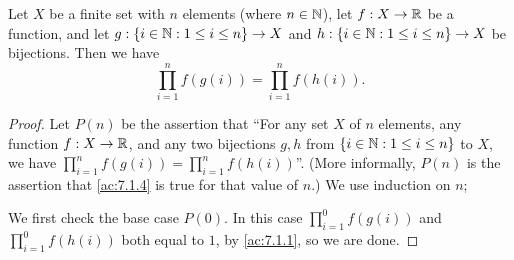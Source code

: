 \begin{ac}\label{ac:7.1.4}
  Let \(X\) be a finite set with \(n\) elements (where \(n \in \mathbb{N}\)), let \(f : X \to \mathbb{R}\) be a function, and let \(g : \{i \in \mathbb{N} : 1 \leq i \leq n\} \to X\) and \(h : \{i \in \mathbb{N} : 1 \leq i \leq n\} \to X\) be bijections.
  Then we have
  \[
    \prod_{i = 1}^n f(g(i)) = \prod_{i = 1}^n f(h(i)).
  \]
\end{ac}

\begin{proof}
  Let \(P(n)\) be the assertion that ``For any set \(X\) of \(n\) elements, any function \(f : X \to \mathbb{R}\), and any two bijections \(g, h\) from \(\{i \in \mathbb{N} : 1 \leq i \leq n\}\) to \(X\), we have \(\prod_{i = 1}^n f(g(i)) = \prod_{i = 1}^n f(h(i))\)''.
  (More informally, \(P(n)\) is the assertion that \cref{ac:7.1.4} is true for that value of \(n\).)
  We use induction on \(n\);

  We first check the base case \(P(0)\).
  In this case \(\prod_{i = 1}^0 f(g(i))\) and \(\prod_{i = 1}^0 f(h(i))\) both equal to \(1\), by \cref{ac:7.1.1}, so we are done.


\end{proof}
